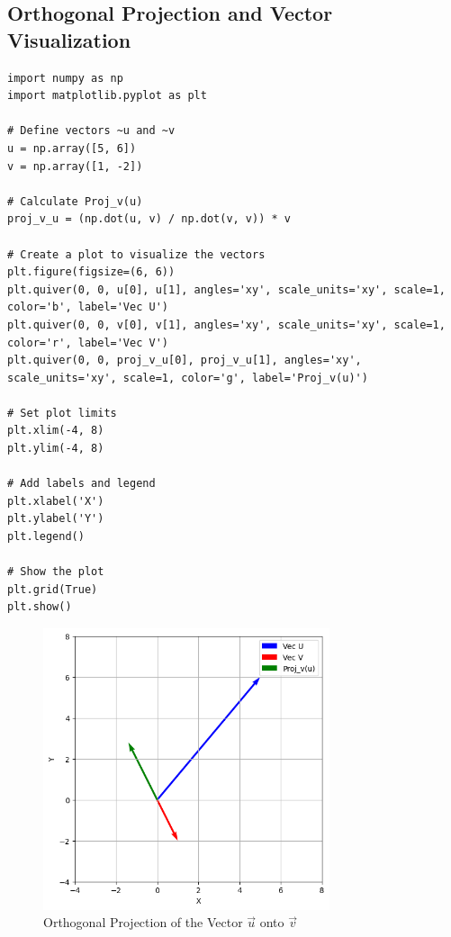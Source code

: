 \subsection{Orthogonal Projection and Vector Visualization}
% 
% 
\begin{lstlisting}[style=pystyle]
import numpy as np
import matplotlib.pyplot as plt

# Define vectors ~u and ~v
u = np.array([5, 6])
v = np.array([1, -2])

# Calculate Proj_v(u)
proj_v_u = (np.dot(u, v) / np.dot(v, v)) * v

# Create a plot to visualize the vectors
plt.figure(figsize=(6, 6))
plt.quiver(0, 0, u[0], u[1], angles='xy', scale_units='xy', scale=1, color='b', label='Vec U')
plt.quiver(0, 0, v[0], v[1], angles='xy', scale_units='xy', scale=1, color='r', label='Vec V')
plt.quiver(0, 0, proj_v_u[0], proj_v_u[1], angles='xy', scale_units='xy', scale=1, color='g', label='Proj_v(u)')

# Set plot limits
plt.xlim(-4, 8)
plt.ylim(-4, 8)

# Add labels and legend
plt.xlabel('X')
plt.ylabel('Y')
plt.legend()

# Show the plot
plt.grid(True)
plt.show()

\end{lstlisting}



\begin{figure}[H]
    \centering
    \includegraphics[width=0.75\textwidth]{pic/Orthogonal_Projection.png}
    \caption{Orthogonal Projection of the Vector $\vec{u}$ onto $\vec{v}$}
\end{figure}